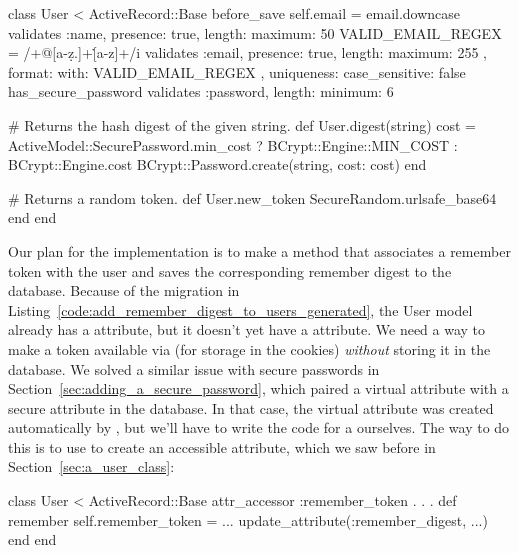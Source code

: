 \begin{codelisting}
\label{code:token_method}
\begin{code}
class User < ActiveRecord::Base
  before_save { self.email = email.downcase }
  validates :name,  presence: true, length: { maximum: 50 }
  VALID_EMAIL_REGEX = /\A[\w+\-.]+@[a-z\d\-.]+\.[a-z]+\z/i
  validates :email, presence: true, length: { maximum: 255 },
                    format: { with: VALID_EMAIL_REGEX },
                    uniqueness: { case_sensitive: false }
  has_secure_password
  validates :password, length: { minimum: 6 }

  # Returns the hash digest of the given string.
  def User.digest(string)
    cost = ActiveModel::SecurePassword.min_cost ? BCrypt::Engine::MIN_COST :
                                                  BCrypt::Engine.cost
    BCrypt::Password.create(string, cost: cost)
  end

  # Returns a random token.
  def User.new_token
    SecureRandom.urlsafe_base64
  end
end
\end{code}
\end{codelisting}

Our plan for the implementation is to make a  method that associates a remember token with the user and saves the corresponding remember digest to the database. Because of the migration in Listing~\ref{code:add_remember_digest_to_users_generated}, the User model already has a  attribute, but it doesn't yet have a  attribute. We need a way to make a token available via  (for storage in the cookies) \emph{without} storing it in the database. We solved a similar issue with secure passwords in Section~\ref{sec:adding_a_secure_password}, which paired a virtual  attribute with a secure  attribute in the database. In that case, the virtual  attribute was created automatically by , but we'll have to write the code for a  ourselves. The way to do this is to use  to create an accessible attribute, which we saw before in Section~\ref{sec:a_user_class}:

\begin{code}
class User < ActiveRecord::Base
  attr_accessor :remember_token
  .
  .
  .
  def remember
    self.remember_token = ...
    update_attribute(:remember_digest, ...)
  end
end
\end{code}

